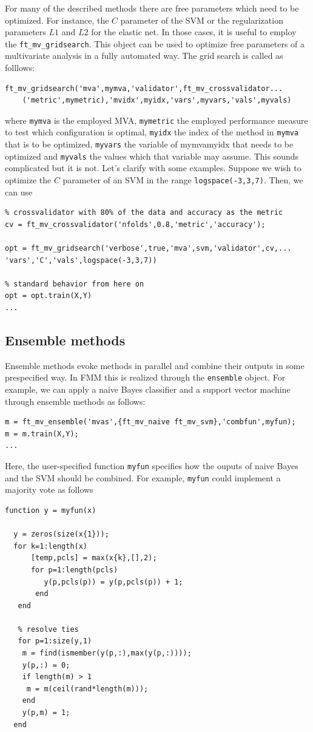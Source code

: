\documentclass{article}
\renewcommand{\t}[1]{{\tt #1}}
\begin{document}
For many of the described methods there are free parameters which need to be optimized. For instance, the $C$ parameter of the SVM or  the regularization parameters $L1$ and $L2$ for the elastic net.  In those cases, it is useful to employ the \t{ft\_mv\_gridsearch}.  This object can be used to optimize free parameters of a multivariate analysis in a fully automated way. The grid search is called as folllows:
\begin{verbatim}
ft_mv_gridsearch('mva',mymva,'validator',ft_mv_crossvalidator...
	('metric',mymetric),'mvidx',myidx,'vars',myvars,'vals',myvals)
\end{verbatim}
where \t{mymva} is the employed MVA, \t{mymetric} the employed performance measure to test which configuration is optimal, \t{myidx} the index of the method in \t{mymva} that is to be optimized, \t{myvars} the variable of mymva{myidx} that needs to be optimized and \t{myvals} the values which that variable may assume. This sounds complicated but it is not. Let's clarify with some examples. Suppose we wish to optimize the $C$ parameter of an SVM in the range \t{logspace(-3,3,7)}. Then, we can use 
\begin{verbatim}
% crossvalidator with 80% of the data and accuracy as the metric
cv = ft_mv_crossvalidator('nfolds',0.8,'metric','accuracy'); 

opt = ft_mv_gridsearch('verbose',true,'mva',svm,'validator',cv,...
'vars','C','vals',logspace(-3,3,7))

% standard behavior from here on
opt = opt.train(X,Y) 
...
\end{verbatim}






\subsection{Ensemble methods}

Ensemble methods evoke methods in parallel and combine their outputs in some prespecified way. In FMM this is realized through the \t{ensemble} object. For example, we can apply a naive Bayes classifier and a support vector machine through ensemble methods as follows:
\begin{verbatim}
m = ft_mv_ensemble('mvas',{ft_mv_naive ft_mv_svm},'combfun',myfun);
m = m.train(X,Y);
...
\end{verbatim}
Here, the user-specified function \t{myfun} specifies how the ouputs of naive Bayes and the SVM should be combined. For example, \t{myfun} could implement a majority vote as follows
\begin{verbatim}
function y = myfun(x)

  y = zeros(size(x{1}));
  for k=1:length(x)
      [temp,pcls] = max(x{k},[],2);
      for p=1:length(pcls)
         y(p,pcls(p)) = y(p,pcls(p)) + 1;
       end
   end
            
   % resolve ties
   for p=1:size(y,1)
    m = find(ismember(y(p,:),max(y(p,:))));
    y(p,:) = 0;
    if length(m) > 1
     m = m(ceil(rand*length(m)));
    end
    y(p,m) = 1;
  end
\end{verbatim}
\end{document}
